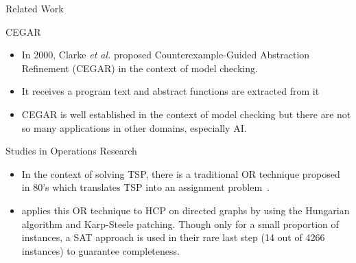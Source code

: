 \documentclass{beamer}
\begin{document}
\begin{frame}{Related Work}
  \begin{block}{CEGAR~\cite{DBLP:conf/cav/ClarkeGJLV00}}
    \begin{itemize}
    \item In 2000, Clarke \textit{et al.} proposed Counterexample-Guided
Abstraction Refinement (CEGAR) in the context of model
checking.
    \item It receives a program text and abstract functions are extracted from it
      \item CEGAR is well established in the context of model checking but
 there are not so many applications in other domains,
especially AI. 
    \end{itemize}    
  \end{block}

  \begin{block}{Studies in Operations Research}
    \begin{itemize}
    \item In the context of solving TSP, there is a traditional OR technique
proposed in 80's which translates TSP into an assignment
problem~\cite{capaneto80,TSP-AP-Laporte92}. 
    \item \cite{DBLP:journals/jair/JagerZ10}
applies this OR technique to HCP on directed graphs by using the
Hungarian algorithm and Karp-Steele patching. 
%
Though only for a small proportion of instances, a SAT approach is
used in their rare last step (14 out of 4266 instances) to guarantee
completeness.
    \end{itemize}
  \end{block}

\end{frame}
\end{document}
